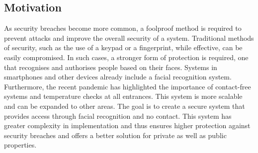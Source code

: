 \documentclass[conference]{IEEEtran}
\begin{document}
	
	
	\subsection{Motivation}
	As security breaches become more common, a foolproof method is required to prevent attacks and improve the overall security of a system. Traditional methods of security, such as the use of a keypad or a fingerprint, while effective, can be easily compromised. In such cases, a stronger form of protection is required, one that recognises and authorises people based on their faces. Systems in smartphones and other devices already include a facial recognition system. Furthermore, the recent pandemic has highlighted the importance of contact-free systems and temperature checks at all entrances. This system is more scalable and can be expanded to other areas. The goal is to create a secure system that provides access through facial recognition and no contact. This system has greater complexity in implementation and thus ensures higher protection against security breaches and offers a better solution for private as well as public properties.
	
\end{document}
